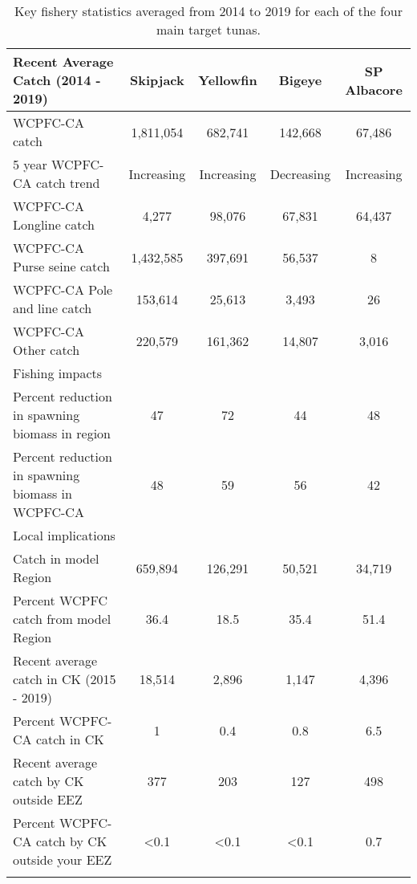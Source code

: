 \begingroup\fontsize{8pt}{11pt}\selectfont
\begin{longtable}{lcccc}
\caption{Key fishery statistics averaged from 2014 to 2019 for each of the four main target tunas.} \\ 
  \hline
\hline
{\small{{Recent Average Catch (2014 - 2019)}}} & {\small{{Skipjack}}} & {\small{{Yellowfin}}} & {\small{{Bigeye}}} & {\small{{SP Albacore}}} \\ 
  \hline
WCPFC-CA catch & 1,811,054 & 682,741 & 142,668 & 67,486 \\ 
  5 year WCPFC-CA catch trend & Increasing & Increasing & Decreasing & Increasing \\ 
  WCPFC-CA Longline catch & 4,277 & 98,076 & 67,831 & 64,437 \\ 
  WCPFC-CA Purse seine catch & 1,432,585 & 397,691 & 56,537 & 8 \\ 
  WCPFC-CA Pole and line catch & 153,614 & 25,613 & 3,493 & 26 \\ 
  WCPFC-CA Other catch & 220,579 & 161,362 & 14,807 & 3,016 \\ 
  Fishing impacts &  &  &  &  \\ 
   Percent reduction in spawning biomass in region & 47 & 72 & 44 & 48 \\ 
  Percent reduction in spawning biomass in WCPFC-CA & 48 & 59 & 56 & 42 \\ 
  Local implications &  &  &  &  \\ 
   Catch in model Region & 659,894 & 126,291 & 50,521 & 34,719 \\ 
  Percent WCPFC catch from model Region & 36.4 & 18.5 & 35.4 & 51.4 \\ 
  Recent average catch in CK (2015 - 2019) & 18,514 & 2,896 & 1,147 & 4,396 \\ 
  Percent WCPFC-CA catch in CK & 1 & 0.4 & 0.8 & 6.5 \\ 
  Recent average catch by CK outside EEZ & 377 & 203 & 127 & 498 \\ 
  Percent WCPFC-CA catch by CK outside your EEZ & <0.1 & <0.1 & <0.1 & 0.7 \\ 
   \hline
\hline
\label{tab2}
\end{longtable}
\endgroup
